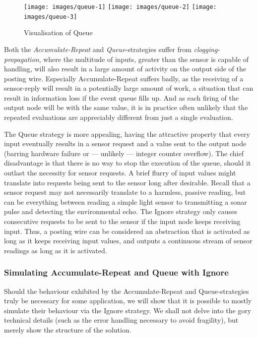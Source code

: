 \documentclass[a4paper, oneside, final]{memoir}
\begin{document}
\begin{figure}
  \texttt{[image: images/queue-1]}
  \texttt{[image: images/queue-2]}
  \texttt{[image: images/queue-3]}
  \caption{Visualisation of Queue}
  \centering
  \label{fig:queue}
\end{figure}

Both the \textit{Accumulate-Repeat} and \textit{Queue}-strategies
suffer from \textit{clogging-propagation}, where the multitude of
inputs, greater than the sensor is capable of handling, will also
result in a large amount of activity on the output side of the posting
wire.  Especially Accumulate-Repeat suffers badly, as the receiving of
a sensor-reply will result in a potentially large amount of work, a
situation that can result in information loss if the event queue fills
up.  And as each firing of the output node will be with the same
value, it is in practice often unlikely that the repeated evaluations
are appreciably different from just a single evaluation.

The Queue strategy is more appealing, having the attractive property
that every input eventually results in a sensor request and a value
sent to the output node (barring hardware failure or --- unlikely ---
integer counter overflow).  The chief disadvantage is that there is no
way to stop the execution of the queue, should it outlast the
necessity for sensor requests.  A brief flurry of input values might
translate into requests being sent to the sensor long after desirable.
Recall that a sensor request may not necessarily translate to a
harmless, passive reading, but can be everything between reading a
simple light sensor to transmitting a sonar pulse and detecting the
environmental echo.  The Ignore strategy only causes consecutive
requests to be sent to the sensor if the input node keeps receiving
input.  Thus, a posting wire can be considered an abstraction that is
activated as long as it keeps receiving input values, and outputs a
continuous stream of sensor readings as long as it is activated.

\subsubsection{Simulating Accumulate-Repeat and Queue with Ignore}

Should the behaviour exhibited by the Accumulate-Repeat and
Queue-strategies truly be necessary for some application, we will
show that it is possible to mostly simulate their behaviour via the
Ignore strategy.  We shall not delve into the gory technical details
(such as the error handling necessary to avoid fragility), but
merely show the structure of the solution.
\end{document}
